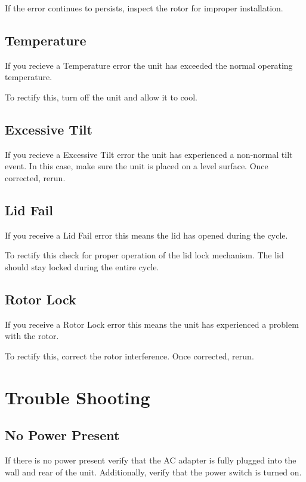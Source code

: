 \documentclass[12pt]{../SOP3_beta}
\begin{document}
\NP If the error continues to persists, inspect the rotor for improper installation. 

\subsection*{Temperature}

\NP If you recieve a Temperature error the unit has exceeded the normal operating temperature. 

\NP To rectify this, turn off the unit and allow it to cool. 

\subsection*{Excessive Tilt}

\NP If you recieve a Excessive Tilt error the unit has experienced a non-normal tilt event. In this case, make sure the unit is placed on a level surface. Once corrected, rerun. 

\subsection*{Lid Fail}

\NP If you receive a Lid Fail error this means the lid has opened during the cycle. 

\NP To rectify this check for proper operation of the lid lock mechanism. The lid should stay locked during the entire cycle. 

\subsection*{Rotor Lock}

\NP If you receive a Rotor Lock error this means the unit has experienced a problem with the rotor. 

\NP To rectify this, correct the rotor interference. Once corrected, rerun. 

\section{Trouble Shooting}

\subsection*{No Power Present} 

\NP If there is no power present verify that the AC adapter is fully plugged into the wall and rear of the unit. Additionally, verify that the power switch is turned on. 
\end{document}
